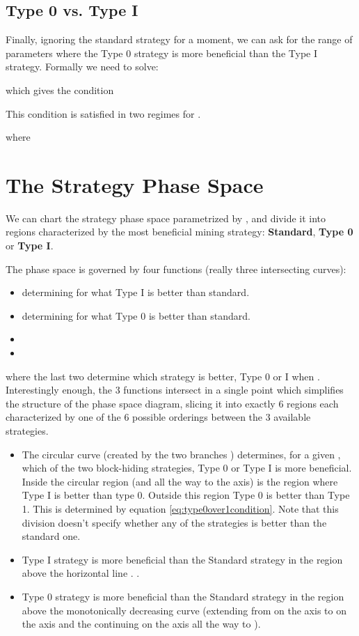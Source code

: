 \documentclass[letterpaper,12pt]{report}
\begin{document}
\subsection{Type 0 vs. Type I}

Finally, ignoring the standard strategy for a moment, we can ask for the range of parameters  where the Type 0 strategy is more beneficial than the Type I strategy. Formally we need to solve:



which gives the condition



This condition is satisfied in two regimes for .


where 




\section{The Strategy Phase Space}\label{sec:phasespace}

We can chart the strategy phase space parametrized by , and divide it into regions characterized by the most beneficial mining strategy: \textbf{Standard}, \textbf{Type 0} or \textbf{Type I}.

The  phase space is governed by four functions (really three intersecting curves):
\begin{itemize}
\item  determining for what  Type I is better than standard.
\item  determining for what  Type 0 is better than standard.
\item  
\item 
\end{itemize}
where the last two determine which strategy is better, Type 0 or I when .
Interestingly enough, the 3 functions  intersect in a single point  which simplifies the structure of the phase space diagram, slicing it into exactly 6 regions each characterized by one of the 6 possible orderings between the 3 available strategies.

\begin{itemize}
\item The circular curve (created by the two branches ) determines, for a given , which of the two block-hiding strategies, Type 0 or Type I is more beneficial. Inside the circular region (and all the way to the  axis) is the region where Type I is better than type 0. Outside this region Type 0 is better than Type 1. This is determined by equation \ref{eq:type0over1condition}. Note that this division doesn't specify whether any of the strategies is better than the standard one.
\item Type I strategy is more beneficial than the Standard strategy in the region above the horizontal line . .
\item Type 0 strategy is more beneficial than the Standard strategy in the region above the monotonically decreasing curve  (extending from  on the  axis to  on the  axis and the continuing on the  axis all the way to ).
\end{itemize}
\end{document}
